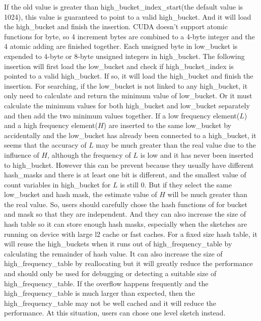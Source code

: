 \documentclass[conference]{IEEEtran}
\begin{document}
If the old value is greater than high\_bucket\_index\_start(the default value is 1024), this value is guaranteed to point to a valid high\_bucket. And it will load the high\_bucket and finish the insertion. 
CUDA doesn't support atomic functions for byte, so 4 increment bytes are combined to a 4-byte integer and the 4 atomic adding are finished together. 
Each unsigned byte in low\_bucket is expended to 4-byte or 8-byte unsigned integers in high\_bucket.
The following insertion will first load the low\_bucket and check if high\_bucket\_index is pointed to a valid high\_bucket. If so, it will load the high\_bucket and finish the insertion. 
For searching, if the low\_bucket is not linked to any high\_bucket, it only need to calculate and return the minimum value of low\_bucket. Or it must calculate the minimum values for both high\_bucket and low\_bucket separately and then add the two minimum values together. If a low frequency element($L$) and a high frequency element($H$) are inserted to the same low\_bucket by accidentally and the low\_bucket has already been connected to a high\_bucket, it seems that the accuracy of $L$ may be much greater than the real value due to the influence of $H$, although the frequency of $L$ is low and it has never been inserted to high\_bucket. However this can be prevent because they usually have different hash\_masks and there is at least one bit is different, and the smallest value of count variables in high\_bucket for $L$ is still 0. But if they select the same low\_bucket and hash mask, the estimate value of $H$ will be much greater than the real value. So, users should carefully chose the hash functions of for bucket and mask so that they are independent. And they can also increase the size of hash table so it can store enough hash masks, especially when the sketches are running on device with large l2 cache or fast caches. For a fixed size hash table, it will reuse the high\_buckets when it runs out of high\_frequency\_table by calculating the remainder of hash value. It can also increase the size of high\_frequency\_table by reallocating but it will greatly reduce the performance and should only be used for debugging or detecting a suitable size of high\_frequency\_table. If the overflow happens frequently and the high\_frequency\_table is much larger than expected, then the high\_frequency\_table may not be well cached and it will reduce the performance. At this situation, users can chose one level sketch instead.

\end{document}
